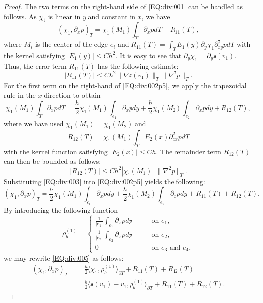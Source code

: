 \documentclass[final,leqno]{siamltex704}
\def\S{{\mathfrak s}}
\def\pT{{\partial T}}
\begin{document}
\begin{proof}
The two terms on the right-hand side of \eqref{EQ:div:001} can be handled as follows. As $\chi_1$ is linear in $y$ and constant in $x$, we have
\begin{equation}\label{EQ:div:002p5}
(\chi_1, \partial_x p)_T = \chi_1(M_1) \int_T \partial_xp dT + R_{11}(T),
\end{equation}
where $M_i$ is the center of the edge $e_i$ and $R_{11}(T) = \int_T E_1(y)\partial_y \chi_1 \partial_{xy}^2 p dT$ with the kernel satisfying $|E_1(y)|\leq C h^2$. It is easy to see that $\partial_y \chi_1 = \partial_y \S(v_1)$. Thus, the error term $R_{11}(T)$ has the following estimate:
\begin{equation}\label{EQ:div:002}
|R_{11}(T)| \leq C h^2 \|\nabla \S(v_1)\|_T \|\nabla^2 p\|_T.
\end{equation}
For the first term on the right-hand of \eqref{EQ:div:002p5}, we apply the trapezoidal rule in the $x$-direction to obtain
\begin{equation}\label{EQ:div:003}
\chi_1(M_1) \int_T \partial_xp dT = \frac{h}{2} \chi_1(M_1) \int_{e_1} \partial_x p dy + \frac{h}{2} \chi_1(M_2) \int_{e_2} \partial_x p dy + R_{12}(T),
\end{equation}
where we have used $\chi_1(M_1) = \chi_1(M_2)$ and
$$
R_{12}(T) = \chi_1(M_1) \int_T E_2(x) \partial_{xx}^2 p dT
$$
with the kernel function satisfying $|E_2(x)|\leq C h$. The remainder term $R_{12}(T)$ can then be bounded as follows:
\begin{equation}\label{EQ:div:004}
|R_{12}(T)| \leq C h^2 |\chi_1(M_1)|\ \|\nabla^2 p\|_T.
\end{equation}
Substituting \eqref{EQ:div:003} into \eqref{EQ:div:002p5} yields the following:
\begin{equation}\label{EQ:div:005}
(\chi_1, \partial_x p)_T = \frac{h}{2} \chi_1(M_1) \int_{e_1} \partial_x p dy + \frac{h}{2} \chi_1(M_2) \int_{e_2} \partial_x p dy + R_{11}(T)+R_{12}(T).
\end{equation}
By introducing the following function
$$
\rho_b^{(1)}=\left\{
\begin{array}{rl}
\frac{1}{|e_1|} \int_{e_1} \partial_x p dy\qquad &\mbox{on } e_1,\\
\frac{1}{|e_2|} \int_{e_2} \partial_x p dy\qquad &\mbox{on } e_2,\\
0 \qquad &\mbox{on $e_3$ and $e_4$},
\end{array}
\right.
$$
we may rewrite \eqref{EQ:div:005} as follows:
\begin{equation}\label{EQ:div:006}
\begin{split}
(\chi_1, \partial_x p)_T = &\ \frac{h}{2} \langle \chi_1, \rho_b^{(1)}\rangle_\pT + R_{11}(T)+R_{12}(T)\\
=& \ \frac{h}{2} \langle \S(v_1) - v_1, \rho_b^{(1)}\rangle_\pT + R_{11}(T)+R_{12}(T).
\end{split}
\end{equation}


\end{proof}
\end{document}

